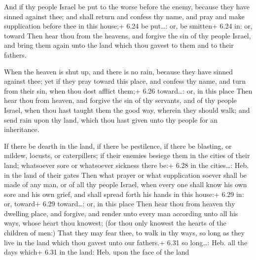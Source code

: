  And if thy people Israel be put to the worse before the
enemy, because they have sinned against thee; and shall return and
confess thy name, and pray and make supplication before thee in this
house;+ 6.24 be put\ldots: or, be smitten+ 6.24 in: or, toward
 Then hear thou from the heavens, and forgive the sin of
thy people Israel, and bring them again unto the land which thou gavest
to them and to their fathers.

 When the heaven is shut up, and there is no rain,
because they have sinned against thee; yet if they pray toward this
place, and confess thy name, and turn from their sin, when thou dost
afflict them;+ 6.26 toward\ldots: or, in this place  Then
hear thou from heaven, and forgive the sin of thy servants, and of thy
people Israel, when thou hast taught them the good way, wherein they
should walk; and send rain upon thy land, which thou hast given unto thy
people for an inheritance.

 If there be dearth in the land, if there be pestilence,
if there be blasting, or mildew, locusts, or caterpillers; if their
enemies besiege them in the cities of their land; whatsoever sore or
whatsoever sickness there be:+ 6.28 in the cities\ldots: Heb. in the
land of their gates  Then what prayer or what supplication
soever shall be made of any man, or of all thy people Israel, when every
one shall know his own sore and his own grief, and shall spread forth
his hands in this house:+ 6.29 in: or, toward+ 6.29 toward\ldots: or, in
this place  Then hear thou from heaven thy dwelling place,
and forgive, and render unto every man according unto all his ways,
whose heart thou knowest; (for thou only knowest the hearts of the
children of men:)  That they may fear thee, to walk in thy
ways, so long as they live in the land which thou gavest unto our
fathers.+ 6.31 so long\ldots: Heb. all the days which+ 6.31 in the land:
Heb. upon the face of the land

